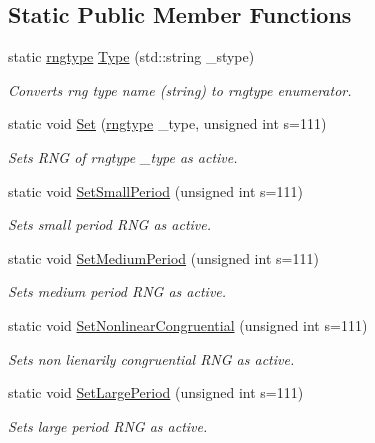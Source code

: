 \subsection*{Static Public Member Functions}
\begin{DoxyCompactItemize}
\item 
static \hyperlink{class_c_random_generator_a50566d64b5ada7e335fc3acd52d958f6}{rngtype} \hyperlink{class_c_random_generator_a0b36272b7fe837c77b02ab2c25b8cb5b}{Type} (std\-::string \-\_\-stype)
\begin{DoxyCompactList}\small\item\em Converts rng type name (string) to rngtype enumerator. \end{DoxyCompactList}\item 
static void \hyperlink{class_c_random_generator_a8b74092dd24f835e172ce00baa173a7e}{Set} (\hyperlink{class_c_random_generator_a50566d64b5ada7e335fc3acd52d958f6}{rngtype} \-\_\-type, unsigned int s=111)
\begin{DoxyCompactList}\small\item\em Sets R\-N\-G of rngtype \-\_\-type as active. \end{DoxyCompactList}\item 
static void \hyperlink{class_c_random_generator_af3eff2b225bf87723c3ced1652d84100}{Set\-Small\-Period} (unsigned int s=111)
\begin{DoxyCompactList}\small\item\em Sets small period R\-N\-G as active. \end{DoxyCompactList}\item 
static void \hyperlink{class_c_random_generator_a3db2425b8b2a2b172dacd7f71dd27bf0}{Set\-Medium\-Period} (unsigned int s=111)
\begin{DoxyCompactList}\small\item\em Sets medium period R\-N\-G as active. \end{DoxyCompactList}\item 
static void \hyperlink{class_c_random_generator_a23e5084a4c1ee2a8d64f858aee6da662}{Set\-Nonlinear\-Congruential} (unsigned int s=111)
\begin{DoxyCompactList}\small\item\em Sets non lienarily congruential R\-N\-G as active. \end{DoxyCompactList}\item 
static void \hyperlink{class_c_random_generator_ad52f13fa1186cdf5869262efc3349428}{Set\-Large\-Period} (unsigned int s=111)
\begin{DoxyCompactList}\small\item\em Sets large period R\-N\-G as active. \end{DoxyCompactList}\item 

\end{DoxyCompactItemize}
